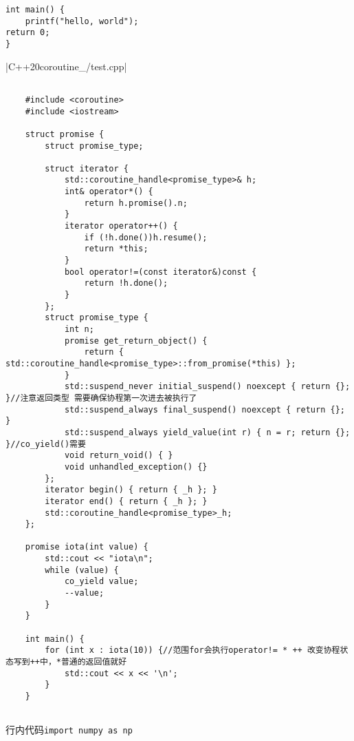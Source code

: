 \documentclass{ctexart}
\begin{document}
\begin{verbatim}
int main() {
    printf("hello, world");
return 0;
}
\end{verbatim}

|C++20coroutine_/test.cpp|
\begin{verbatim}
    
    #include <coroutine>
    #include <iostream>
    
    struct promise {
        struct promise_type;
    
        struct iterator {
            std::coroutine_handle<promise_type>& h;
            int& operator*() {
                return h.promise().n;
            }
            iterator operator++() {
                if (!h.done())h.resume();
                return *this;
            }
            bool operator!=(const iterator&)const {
                return !h.done();
            }
        };
        struct promise_type {
            int n;
            promise get_return_object() {
                return { std::coroutine_handle<promise_type>::from_promise(*this) };
            }
            std::suspend_never initial_suspend() noexcept { return {}; }//注意返回类型 需要确保协程第一次进去被执行了
            std::suspend_always final_suspend() noexcept { return {}; }
            std::suspend_always yield_value(int r) { n = r; return {}; }//co_yield()需要
            void return_void() { }
            void unhandled_exception() {}
        };
        iterator begin() { return { _h }; }
        iterator end() { return { _h }; }
        std::coroutine_handle<promise_type>_h;
    };
    
    promise iota(int value) {
        std::cout << "iota\n";
        while (value) {
            co_yield value;
            --value;
        }
    }
    
    int main() {
        for (int x : iota(10)) {//范围for会执行operator!= * ++ 改变协程状态写到++中，*普通的返回值就好 
            std::cout << x << '\n';
        }
    }
    
\end{verbatim}

行内代码\texttt{import numpy as np}
\end{document}
